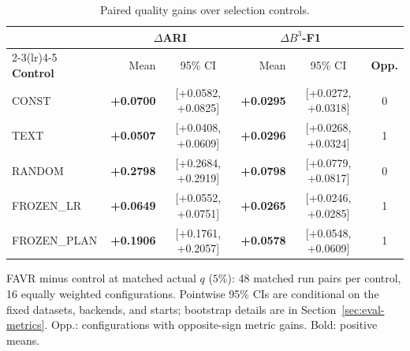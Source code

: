 \begin{table}[!htbp]
\centering
\caption{Paired quality gains over selection controls.}
\label{tab:rq2-control}
\begin{minipage}{\linewidth}
\centering
\begingroup
\fontsize{8.5}{9.6}\selectfont
\setlength{\tabcolsep}{2pt}
\renewcommand{\arraystretch}{1.0}
\setlength{\heavyrulewidth}{0.7pt}
\setlength{\lightrulewidth}{0.35pt}
\setlength{\aboverulesep}{1.4pt}
\setlength{\belowrulesep}{1.8pt}
\begin{tabular*}{\linewidth}{@{\extracolsep{\fill}}lrc@{\hspace{9pt}}rcc@{}}
\toprule
 & \multicolumn{2}{c}{$\Delta$ARI} & \multicolumn{2}{c}{$\Delta B^3$-F1} & \\
\cmidrule(lr){2-3}\cmidrule(lr){4-5}
\textbf{Control} & Mean & 95\% CI & Mean & 95\% CI & \textbf{Opp.} \\
\midrule
CONST & \textbf{+0.0700} & [+0.0582, +0.0825] & \textbf{+0.0295} & [+0.0272, +0.0318] & 0 \\
TEXT & \textbf{+0.0507} & [+0.0408, +0.0609] & \textbf{+0.0296} & [+0.0268, +0.0324] & 1 \\
RANDOM & \textbf{+0.2798} & [+0.2684, +0.2919] & \textbf{+0.0798} & [+0.0779, +0.0817] & 0 \\
\addlinespace[2pt]
FROZEN\_LR & \textbf{+0.0649} & [+0.0552, +0.0751] & \textbf{+0.0265} & [+0.0246, +0.0285] & 1 \\
FROZEN\_PLAN & \textbf{+0.1906} & [+0.1761, +0.2057] & \textbf{+0.0578} & [+0.0548, +0.0609] & 1 \\
\bottomrule
\end{tabular*}
\endgroup
\par\vspace{2pt}
{\fontsize{8}{9.2}\selectfont\raggedright FAVR minus control at matched actual $q$ ($5\%$): 48 matched run pairs per control, 16 equally weighted configurations. Pointwise 95\% CIs are conditional on the fixed datasets, backends, and starts; bootstrap details are in Section~\ref{sec:eval-metrics}. Opp.: configurations with opposite-sign metric gains. Bold: positive means.\par}
\end{minipage}
\end{table}
